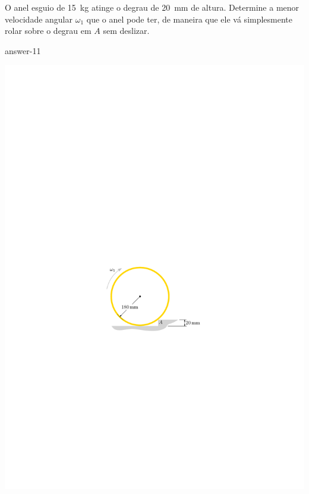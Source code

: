 \item O anel esguio de \SI{15}{\kilogram} atinge o degrau de \SI{20}{\milli\meter} de altura. Determine a menor velocidade angular $\omega_{1}$ que o anel pode ter, de maneira que ele vá simplesmente rolar sobre o degrau em $A$ sem deslizar.

{answer-11}

\vspace{-1cm}
\begin{flushright}
	\includegraphics[scale=1.25]{../../images/draw_7_1}
\end{flushright}
